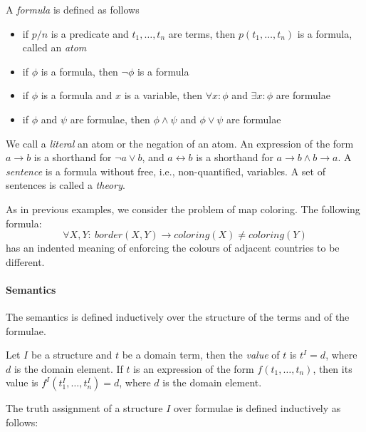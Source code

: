 A \textit{formula} is defined as follows

\begin{itemize}
  \item if $p/n$ is a predicate and $t_1,\dots,t_n$ are terms, then $p(t_1,\dots,t_n)$ is a formula, called an \textit{atom}  
  \item if $\phi$ is a formula, then $\lnot \phi$ is a formula
  \item if $\phi$ is a formula and $x$ is a variable, then $\forall x: \phi$ and $\exists x: \phi$ are formulae 
  \item if $\phi$ and $\psi$ are formulae, then $\phi \wedge \psi$ and $\phi \vee \psi$ are formulae
\end{itemize}

We call a \textit{literal} an atom or the negation of an atom. An expression of the form $a \rightarrow b$ is a shorthand for $\lnot a \vee b$, and $a \leftrightarrow b$ is a shorthand for $a \rightarrow b \wedge b \rightarrow a$. A \textit{sentence} is a formula without free, i.e., non-quantified, variables. A set of sentences  is called a \textit{theory}.

\begin{example}[Formula]\label{example:formula}
  As in previous examples, we consider the problem of map coloring. The following formula:
  \begin{equation*}
    \forall X,Y{:}~\textit{border}(X,Y) \rightarrow \textit{coloring}(X) \neq \textit{coloring}(Y)
  \end{equation*}
has an indented meaning of enforcing the colours of adjacent countries to be different.
\end{example}


\paragraph{Semantics}
The semantics is defined inductively over the structure of the terms and of the formulae.

Let $I$ be a structure and $t$ be a domain term, then the \textit{value} of $t$ is $t^I = d$, where $d$ is the domain element. If $t$ is an expression of the form $f(t_1,\dots,t_n)$, then its value is $f^I(t_1^I,\dots,t_n^I)=d$, where $d$ is the domain element.

The truth assignment of a structure $I$ over formulae is defined inductively as follows:

